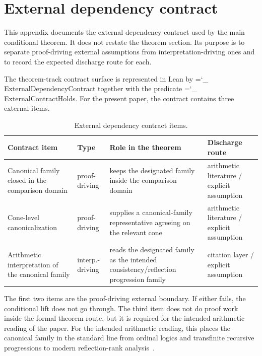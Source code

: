 \documentclass[11pt]{article}
\newcommand{\lid}[1]{{\small\ttfamily\hyphenchar\font=`\_ #1}}
\begin{document}
 \section{External dependency contract}\label{app:external-contract}

This appendix documents the external dependency contract used by the main conditional theorem. It does not restate the theorem section. Its purpose is to separate proof-driving external assumptions from interpretation-driving ones and to record the expected discharge route for each.

The theorem-track contract surface is represented in Lean by \lid{ExternalDependencyContract} together with the predicate \lid{ExternalContractHolds}. For the present paper, the contract contains three external items.

\begin{table}[ht]
\caption{External dependency contract items.}
\label{tab:external-contract}
\centering
\small
\begin{tabularx}{\textwidth}{@{}X l X X@{}}
\toprule
Contract item & Type & Role in the theorem & Discharge route \\
\midrule
Canonical family closed in the comparison domain & proof-driving & keeps the designated family inside the comparison domain & arithmetic literature / explicit assumption \\[6pt]
Cone-level canonicalization & proof-driving & supplies a canonical-family representative agreeing on the relevant cone & arithmetic literature / explicit assumption \\[6pt]
Arithmetic interpretation of the canonical family & interp.-driving & reads the designated family as the intended consistency/reflection progression family & citation layer / explicit assumption \\
\bottomrule
\end{tabularx}
\end{table}

The first two items are the proof-driving external boundary. If either fails, the conditional lift does not go through. The third item does not do proof work inside the formal theorem route, but it is required for the intended arithmetic reading of the paper. For the intended arithmetic reading, this places the canonical family in the standard line from ordinal logics and transfinite recursive progressions to modern reflection-rank analysis~\cite{Turing1939,Feferman1962,BeklemishevReflection,PakhomovWalsh2021,MontalbanWalshConsistency}.
\end{document}
